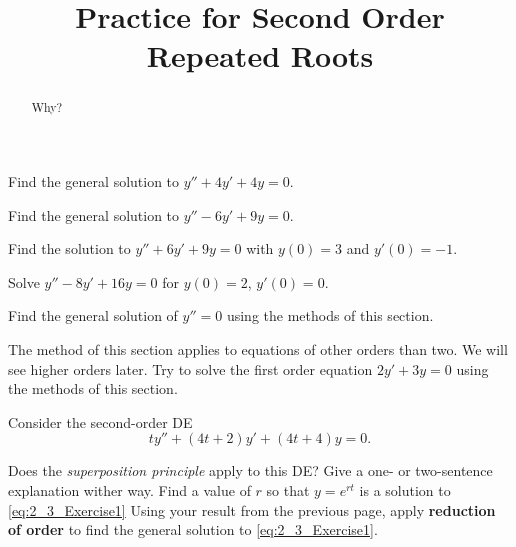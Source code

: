 \documentclass{ximera}
\title{Practice for Second Order Repeated Roots}
\begin{document}
\begin{abstract}
    Why?
\end{abstract}
\maketitle



\begin{exercise}
    Find the general solution to $y'' + 4y' + 4y = 0$.
\end{exercise}

\begin{exercise}%
    Find the general solution to $y''-6y'+9y=0$.
\end{exercise}


\begin{exercise}
    Find the solution to $y'' + 6y' + 9y = 0$ with $y(0) = 3$ and $y'(0) = -1$. 
\end{exercise}

\begin{exercise}
    Solve $y'' - 8y' + 16 y = 0$ for $y(0) = 2$, $y'(0) = 0$.
\end{exercise}

\begin{exercise}
    Find the general solution of $y'' = 0$ using the methods of this section.
\end{exercise}

\begin{exercise}
    The method of this section applies to equations of other orders than two. We will see higher orders later.  Try to solve the first order equation $2y' + 3y = 0$ using the methods of this section.
\end{exercise}

\begin{exercise}
    Consider the second-order DE 
    \begin{equation}
        ty''+(4t+2)y'+(4t+4)y=0. \label{eq:2_3_Exercise1}
    \end{equation}
    \begin{tasks}
        \task Does the {\it superposition principle} apply to this DE? Give a one- or two-sentence explanation wither way.
        \task Find a value of $r$ so that $y=e^{rt}$ is a solution to \eqref{eq:2_3_Exercise1}
        \task Using your result from the previous page, apply {\bf reduction of order} to find the general solution to \eqref{eq:2_3_Exercise1}.
    \end{tasks}
\end{exercise}
\end{document}
